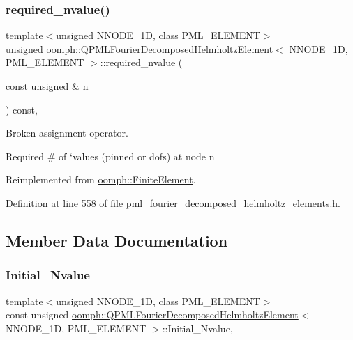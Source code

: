 \subsubsection{\texorpdfstring{required\+\_\+nvalue()}{required\_nvalue()}}
{\footnotesize\ttfamily template$<$unsigned N\+N\+O\+D\+E\+\_\+1D, class P\+M\+L\+\_\+\+E\+L\+E\+M\+E\+NT$>$ \\
unsigned \hyperlink{classoomph_1_1QPMLFourierDecomposedHelmholtzElement}{oomph\+::\+Q\+P\+M\+L\+Fourier\+Decomposed\+Helmholtz\+Element}$<$ N\+N\+O\+D\+E\+\_\+1D, P\+M\+L\+\_\+\+E\+L\+E\+M\+E\+NT $>$\+::required\+\_\+nvalue (\begin{DoxyParamCaption}\item[{const unsigned \&}]{n }\end{DoxyParamCaption}) const\hspace{0.3cm}{\ttfamily [inline]}, {\ttfamily [virtual]}}



Broken assignment operator. 

Required \# of `values\textquotesingle{} (pinned or dofs) at node n 

Reimplemented from \hyperlink{classoomph_1_1FiniteElement_a56610c60d5bc2d7c27407a1455471b1a}{oomph\+::\+Finite\+Element}.



Definition at line 558 of file pml\+\_\+fourier\+\_\+decomposed\+\_\+helmholtz\+\_\+elements.\+h.



\subsection{Member Data Documentation}
\mbox{\label{classoomph_1_1QPMLFourierDecomposedHelmholtzElement_a42902864b05d224d4d640739a418ca97}} 
\subsubsection{\texorpdfstring{Initial\+\_\+\+Nvalue}{Initial\_Nvalue}}
{\footnotesize\ttfamily template$<$unsigned N\+N\+O\+D\+E\+\_\+1D, class P\+M\+L\+\_\+\+E\+L\+E\+M\+E\+NT$>$ \\
const unsigned \hyperlink{classoomph_1_1QPMLFourierDecomposedHelmholtzElement}{oomph\+::\+Q\+P\+M\+L\+Fourier\+Decomposed\+Helmholtz\+Element}$<$ N\+N\+O\+D\+E\+\_\+1D, P\+M\+L\+\_\+\+E\+L\+E\+M\+E\+NT $>$\+::Initial\+\_\+\+Nvalue\hspace{0.3cm}{\ttfamily [static]}, {\ttfamily [private]}}




